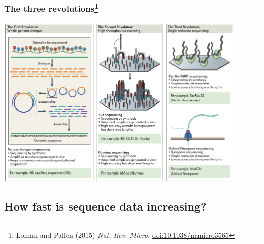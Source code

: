 \begin{frame}
  \frametitle{The three revolutions\footnote{\tiny{Loman and Pallen (2015) \textit{Nat. Rev. Micro.} \href{http://dx.doi.org/10.1038/nrmicro3565}{doi:10.1038/nrmicro3565}}}}
    \begin{center}
      \includegraphics[width=0.9\textwidth]{images/revolutions}\thinspace
    \end{center} 
\end{frame}

\subsection{How fast is sequence data increasing?}

